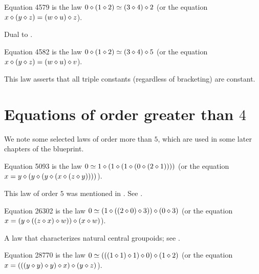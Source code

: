 \begin{definition}[Equation 4579]\label{eq4579}\leanok{}  Equation 4579 is the law $0 \diamond (1 \diamond 2)  \simeq  (3 \diamond 4) \diamond 2$ (or the equation $x \diamond (y \diamond z) = (w \diamond u) \diamond z$).
\end{definition}

Dual to .

\begin{definition}[Equation 4582]\label{eq4582}\leanok{}  Equation 4582 is the law $0 \diamond (1 \diamond 2)  \simeq  (3 \diamond 4) \diamond 5$ (or the equation $x \diamond (y \diamond z) = (w \diamond u) \diamond v$).
\end{definition}

This law asserts that all triple constants (regardless of bracketing) are constant.

\section{Equations of order greater than \texorpdfstring{$4$}{4}}

We note some selected laws of order more than $5$, which are used in some later chapters of the blueprint.

\begin{definition}[Equation 5093]
  \label{eq5093}\leanok
  Equation 5093 is the law $0  \simeq 1 \diamond (1 \diamond (1 \diamond (0 \diamond (2 \diamond 1))))$ (or the equation $x = y \diamond (y \diamond (y \diamond (x \diamond (z \diamond y))))$).
\end{definition}

This law of order $5$ was mentioned in \cite{Kisielewicz2}.  See .

\begin{definition}[Equation 26302]
  \label{eq26302}
  Equation 26302 is the law $0  \simeq (1 \diamond ((2 \diamond 0) \diamond 3)) \diamond (0 \diamond 3)$ (or the equation $x = (y \diamond ((z \diamond x) \diamond w)) \diamond (x \diamond w)$).
\end{definition}

A law that characterizes natural central groupoids; see .

\begin{definition}[Equation 28770]
  \label{eq28770}\leanok
  Equation 28770 is the law $0  \simeq  (((1 \diamond 1) \diamond 1) \diamond 0) \diamond (1 \diamond 2)$ (or the equation $x = (((y \diamond y) \diamond y) \diamond x) \diamond (y \diamond z)$).
\end{definition}

